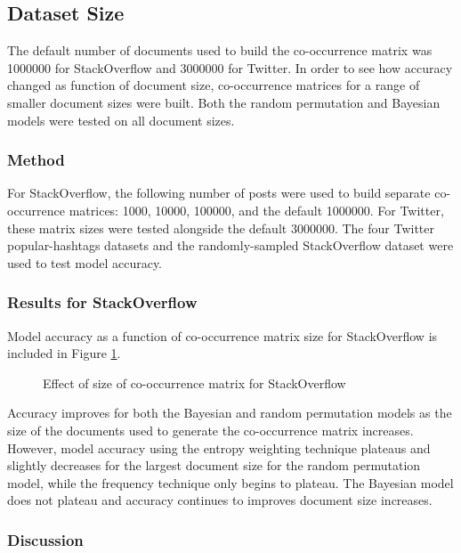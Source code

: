 \documentclass[man,floatsintext,donotrepeattitle]{apa6}
\begin{document}
\subsection{Dataset Size}

The default number of documents used to build the co-occurrence matrix was \num{1000000} for StackOverflow and \num{3000000} for Twitter.
In order to see how accuracy changed as function of document size, 
co-occurrence matrices for a range of smaller document sizes were built.
Both the random permutation and Bayesian models were tested on all document sizes.

\subsubsection{Method}

For StackOverflow, the following number of posts were used to build separate co-occurrence matrices: \num{1000}, \num{10000}, \num{100000}, and the default \num{1000000}.
For Twitter, these matrix sizes were tested alongside the default \num{3000000}.
The four Twitter popular-hashtags datasets and the randomly-sampled StackOverflow dataset were used to test model accuracy.

\subsubsection{Results for StackOverflow}

Model accuracy as a function of co-occurrence matrix size for StackOverflow is included in Figure \ref{figContextDocumentSizeSO}.

\begin{figure}[!htbp]
  \caption{Effect of size of co-occurrence matrix for StackOverflow}
  \label{figContextDocumentSizeSO}
\end{figure}

Accuracy improves for both the Bayesian and random permutation models as the size of the documents used to generate the co-occurrence matrix increases.
However, model accuracy using the entropy weighting technique plateaus and slightly decreases for the largest document size for the random permutation model, while the frequency technique only begins to plateau. 
The Bayesian model does not plateau and accuracy continues to improves document size increases.

\subsubsection{Discussion}
\end{document}
